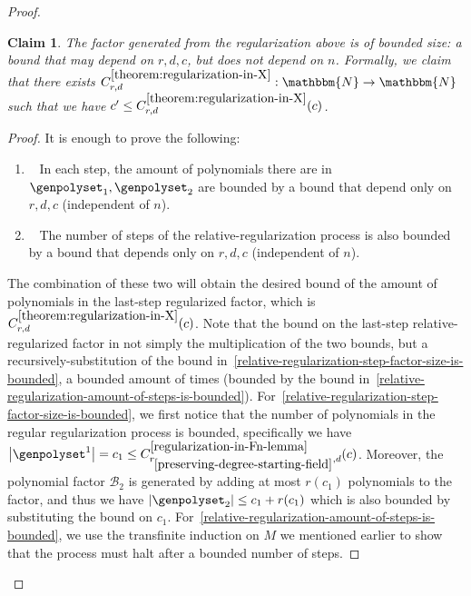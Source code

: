 \documentclass[10pt,a4paper]{article}
\newtheorem{claim}[theorem]{Claim}
\newcommand{\blocklength}[0]{n}
\newcommand{\degree}[0]{d}
\newcommand{\funcdef}[3]{#1:#2\rightarrow#3}
\newcommand{\factor}[0]{\mathcal{B}}
\newcommand{\naturalnumbersset}[0]{\mathbbm{N}}
\newcommand{\rankfunc}[0]{{{{r}}}}
\newcommand{\abs}[1]{\left| #1 \right|}
\begin{document}
\begin{proof}
\begin{claim}
        The factor generated from the regularization above is of bounded size: a bound that may depend on $\rankfunc, \degree, c$, but does not depend on $\blocklength$.
        Formally, we claim that there exists $\funcdef{C^{\ref{theorem:regularization-in-X}}_{\rankfunc, \degree}}{\naturalnumbersset}{\naturalnumbersset}$
        such that we have $c^{\prime} \leq C^{\ref{theorem:regularization-in-X}}_{\rankfunc, \degree}(c)$.
    \end{claim}
    \begin{proof}
        It is enough to prove the following:
        \begin{enumerate}
            \item~\label{relative-regularization-step-factor-size-is-bounded}
            In each step, the amount of polynomials there are in $\genpolyset_1, \genpolyset_2$ are bounded by a bound that depend only on $\rankfunc, \degree, c$ (independent of $\blocklength$).
            \item~\label{relative-regularization-amount-of-steps-is-bounded}
            The number of steps of the relative-regularization process is also bounded by a bound that depends only on $\rankfunc, \degree, c$ (independent of $\blocklength$).
        \end{enumerate}
        The combination of these two will obtain the desired bound of the amount of polynomials in the last-step regularized factor, which is $C^{\ref{theorem:regularization-in-X}}_{\rankfunc, \degree}(c)$.
        Note that the bound on the last-step relative-regularized factor in not simply the multiplication of the two bounds,
        but a recursively-substitution of the bound in~\ref{relative-regularization-step-factor-size-is-bounded},
        a bounded amount of times (bounded by the bound in~\ref{relative-regularization-amount-of-steps-is-bounded}).
        \newline
        For~\ref{relative-regularization-step-factor-size-is-bounded}, we first notice that the number of polynomials in the regular regularization process is bounded,
        specifically we have $\abs{\genpolyset^1} = c_{1} \leq C^{\ref{regularization-in-Fn-lemma}}_{\rankfunc_{\ref{preserving-degree-starting-field}}, \degree}(c)$.
        Moreover, the polynomial factor $\factor_2$ is generated by adding at most $\rankfunc(c_1)$ polynomials to the factor, and thus we have $\abs{\genpolyset_2} \leq c_1 + \rankfunc(c_1)$ which is also bounded by substituting the bound on $c_1$.
        \newline
        For~\ref{relative-regularization-amount-of-steps-is-bounded}, we use the transfinite induction on $M$ we mentioned earlier to show that the process must halt after a bounded number of steps.

\end{proof}
\end{proof}
\end{document}
